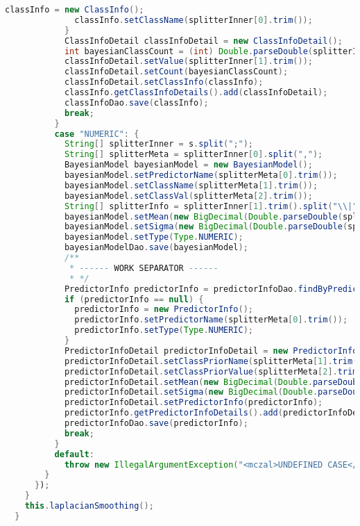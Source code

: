 \begin{lstlisting}[language=Java,basicstyle=\tiny,caption=BayesianModelService.java]
              classInfo = new ClassInfo();
              classInfo.setClassName(splitterInner[0].trim());
            }
            ClassInfoDetail classInfoDetail = new ClassInfoDetail();
            int bayesianClassCount = (int) Double.parseDouble(splitterInner[2].trim());
            classInfoDetail.setValue(splitterInner[1].trim());
            classInfoDetail.setCount(bayesianClassCount);
            classInfoDetail.setClassInfo(classInfo);
            classInfo.getClassInfoDetails().add(classInfoDetail);
            classInfoDao.save(classInfo);
            break;
          }
          case "NUMERIC": {
            String[] splitterInner = s.split(";");
            String[] splitterMeta = splitterInner[0].split(",");
            BayesianModel bayesianModel = new BayesianModel();
            bayesianModel.setPredictorName(splitterMeta[0].trim());
            bayesianModel.setClassName(splitterMeta[1].trim());
            bayesianModel.setClassVal(splitterMeta[2].trim());
            String[] splitterInfo = splitterInner[1].trim().split("\\|");
            bayesianModel.setMean(new BigDecimal(Double.parseDouble(splitterInfo[0].trim())));
            bayesianModel.setSigma(new BigDecimal(Double.parseDouble(splitterInfo[1].trim())));
            bayesianModel.setType(Type.NUMERIC);
            bayesianModelDao.save(bayesianModel);
            /**
             * ------ WORK SEPARATOR ------
             * */
            PredictorInfo predictorInfo = predictorInfoDao.findByPredictorName(splitterMeta[0]);
            if (predictorInfo == null) {
              predictorInfo = new PredictorInfo();
              predictorInfo.setPredictorName(splitterMeta[0].trim());
              predictorInfo.setType(Type.NUMERIC);
            }
            PredictorInfoDetail predictorInfoDetail = new PredictorInfoDetail();
            predictorInfoDetail.setClassPriorName(splitterMeta[1].trim());
            predictorInfoDetail.setClassPriorValue(splitterMeta[2].trim());
            predictorInfoDetail.setMean(new BigDecimal(Double.parseDouble(splitterInfo[0])));
            predictorInfoDetail.setSigma(new BigDecimal(Double.parseDouble(splitterInfo[1])));
            predictorInfoDetail.setPredictorInfo(predictorInfo);
            predictorInfo.getPredictorInfoDetails().add(predictorInfoDetail);
            predictorInfoDao.save(predictorInfo);
            break;
          }
          default:
            throw new IllegalArgumentException("<mczal>UNDEFINED CASE</mczal>");
        }
      });
    }
    this.laplacianSmoothing();
  }


\end{lstlisting}
